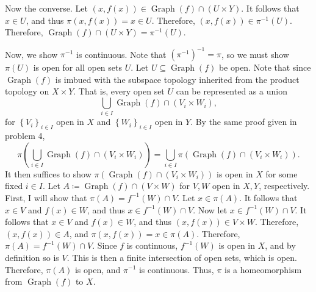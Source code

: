 \documentclass[11pt, letterpaper]{article}
\DeclareMathOperator{\Graph}{Graph}
\begin{document}
Now the converse. Let $(x,f(x))\in \Graph(f)\cap (U\times Y)$. It follows that $x\in U$, and thus $\pi (x,f(x))=x\in U$. Therefore, $(x,f(x))\in \pi ^{-1} (U)$. Therefore, $\Graph(f)\cap (U\times Y)=\pi ^{-1} (U)$.

Now, we show $\pi ^{-1} $ is continuous. Note that $\left( \pi ^{-1}  \right) ^{-1} =\pi $, so we must show $\pi (U)$ is open for all open sets $U$. Let $U\subseteq\Graph(f)$ be open. Note that since $\Graph(f)$ is imbued with the subspace topology inherited from the product topology on $X\times Y$. That is, every open set $U$ can be represented as a union
\[
	\bigcup_{i\in I} \Graph(f) \cap (V_i \times W_i),
\]
for $\left\{ V_i \right\}_{i\in I} $ open in $X$ and $\left\{ W_i \right\}_{i\in I} $ open in $Y$. By the same proof given in problem 4,
\[
	\pi\left( \bigcup_{i\in I} \Graph(f) \cap (V_i \times W_i) \right) =\bigcup_{i\in I} \pi \left( \Graph(f) \cap (V_i \times W_i) \right) 
.\]
It then suffices to show $\pi\left( \Graph(f)\cap (V_i \times W_i )\right)$ is open in $X$ for some fixed $i\in I$. Let $A\coloneqq \Graph(f)\cap (V\times W)$ for $V,W$ open in $X,Y$, respectively. First, I will show that $\pi (A)=f^{-1} (W)\cap V$. Let $x\in \pi (A)$. It follows that $x\in V$ and $f(x)\in W$, and thus $x\in f^{-1} (W)\cap V$. Now let $x\in f^{-1} (W)\cap V$. It follows that $x\in V$ and $f(x)\in W$, and thus $(x,f(x))\in V \times W$. Therefore, $(x,f(x))\in A$, and $\pi (x,f(x))=x\in \pi (A)$. Therefore, $\pi (A)=f^{-1} (W)\cap V$. Since $f$ is continuous, $f^{-1} (W)$ is open in $X$, and by definition so is $V$. This is then a finite intersection of open sets, which is open. Therefore, $\pi (A)$ is open, and $\pi ^{-1} $ is continuous. Thus, $\pi $ is a homeomorphism from $\Graph(f)$ to $X$.
\end{document}
